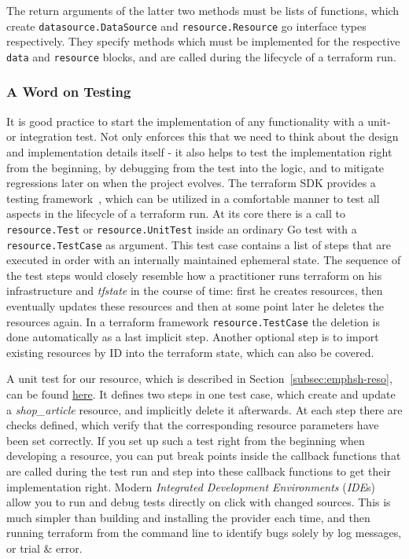 \documentclass[paper=a4,11pt,numbers=noenddot]{article}
\begin{document}
The return arguments of the latter two methods must be lists of functions, which create \verb'datasource.DataSource' and \verb'resource.Resource' go interface types respectively. They specify methods which must be implemented for the respective \verb'data' and \verb'resource' blocks, and are called during the lifecycle of a terraform run.

\subsubsection{A Word on Testing}
\label{subsubsec:note-on-testing}

It is good practice to start the implementation of any functionality with a unit- or integration test. Not only enforces this that we need to think about the design and implementation details itself - it also helps to test the implementation right from the beginning, by debugging from the test into the logic, and to mitigate regressions later on when the project evolves. The terraform SDK provides a testing framework~\autocite{noauthor_terraform_acceptance_testing_nodate}, which can be utilized in a comfortable manner to test all aspects in the lifecycle of a terraform run. At its core there is a call to \verb'resource.Test' or \verb'resource.UnitTest' inside an ordinary Go test with a \verb'resource.TestCase' as argument. This test case contains a list of steps that are executed in order with an internally maintained ephemeral state. The sequence of the test steps would closely resemble how a practitioner runs terraform on his infrastructure and \emph{tfstate} in the course of time: first he creates resources, then eventually updates these resources and then at some point later he deletes the resources again. In a terraform framework \verb'resource.TestCase' the deletion is done automatically as a last implicit step. Another optional step is to import existing resources by ID into the terraform state, which can also be covered.

A unit test for our resource, which is described in Section~\ref{subsec:emphsh-reso}, can be found \href{https://github.com/ecky-l/terraform-provider-example/blob/main/src/tfp-example/example/shop_article_resource_test.go}{here}. It defines two steps in one test case, which create and update a \emph{shop\_article} resource, and implicitly delete it afterwards. At each step there are checks defined, which verify that the corresponding resource parameters have been set correctly. If you set up such a test right from the beginning when developing a resource, you can put break points inside the callback functions that are called during the test run and step into these callback functions to get their implementation right. Modern \emph{Integrated Development Environments} (\emph{IDE}s) allow you to run and debug tests directly on click with changed sources. This is much simpler than building and installing the provider each time, and then running terraform from the command line to identify bugs solely by log messages, or trial \& error.
\end{document}
